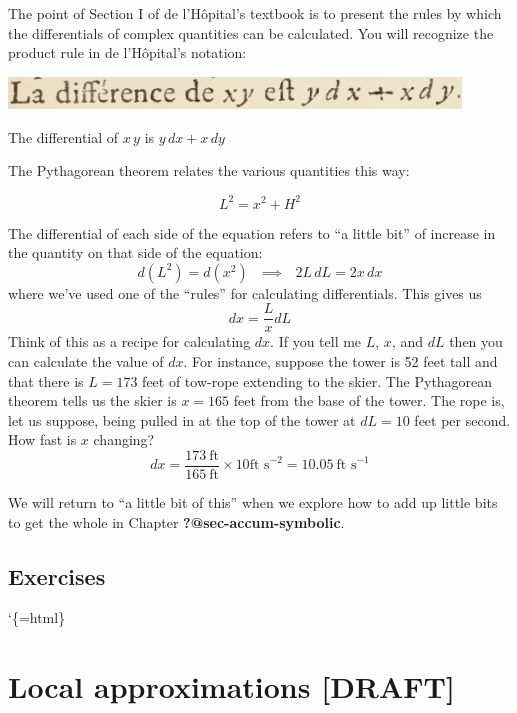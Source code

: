 \documentclass[
  letterpaper,
  DIV=11,
  numbers=noendperiod,
  oneside]{scrreprt}
\begin{document}
The point of Section I of de l'Hôpital's textbook is to present the
rules by which the differentials of complex quantities can be
calculated. You will recognize the product rule in de l'Hôpital's
notation:

\begin{marginfigure}

{\centering \includegraphics[width=0.9\textwidth,height=\textheight]{Differentiation/www/lhopitals-product-rule.png}

}

\caption{The differential of \(x\,y\) is \(y\,dx + x\,dy\)}

\end{marginfigure}

The Pythagorean theorem relates the various quantities this way:

\[L^2 = x^2 + H^2\]

The differential of each side of the equation refers to ``a little bit''
of increase in the quantity on that side of the equation:
\[d(L^2) = d(x^2)\ \ \ \implies\ \ \ 2 L\, dL = 2 x\, dx\] where we've
used one of the ``rules'' for calculating differentials. This gives us
\[dx = \frac{L}{x} dL\] Think of this as a recipe for calculating
\(dx\). If you tell me \(L\), \(x\), and \(dL\) then you can calculate
the value of \(dx\). For instance, suppose the tower is 52 feet tall and
that there is \(L=173\) feet of tow-rope extending to the skier. The
Pythagorean theorem tells us the skier is \(x=165\) feet from the base
of the tower. The rope is, let us suppose, being pulled in at the top of
the tower at \(dL = 10\) feet per second. How fast is \(x\) changing?
\[dx = \frac{173\ \text{ft}}{165\ \text{ft}} \times 10 \text{ft s}^{-2} = 10.05\ \text{ft s}^{-1}\]

We will return to ``a little bit of this'' when we explore how to add up
little bits to get the whole in Chapter \textbf{?@sec-accum-symbolic}.

\hypertarget{exercises-8}{%
\section{Exercises}\label{exercises-8}}

`\{=html\}

\hypertarget{sec-local-approximations}{%
\chapter{Local approximations
{[}DRAFT{]}}\label{sec-local-approximations}}
\end{document}

